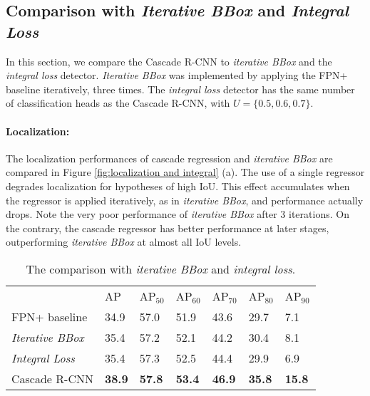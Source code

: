 \documentclass[10pt,twocolumn,letterpaper]{article}
\newcommand{\bd}[1]{\textbf{#1}}
\newcommand{\tablestyle}[2]{\setlength{\tabcolsep}{#1}\renewcommand{\arraystretch}{#2}\centering\footnotesize}
\begin{document}
\subsection{Comparison with \textit{Iterative BBox} and \textit{Integral Loss}}

In this section, we compare the Cascade R-CNN to \textit{iterative BBox} and the \textit{integral loss} detector. \textit{Iterative BBox} was implemented by applying the FPN+ baseline iteratively, three times. The \textit{integral loss} detector has the same number of classification heads as the Cascade R-CNN, with $U=\{0.5,0.6,0.7\}$.

\paragraph{Localization:} The localization performances of cascade regression
and \textit{iterative BBox} are compared in Figure \ref{fig:localization and integral} (a). The use of a single regressor degrades localization for hypotheses of high IoU. This effect accumulates when the regressor is applied iteratively, as in \textit{iterative BBox}, and performance actually drops. Note the very poor performance of \textit{iterative BBox} after 3 iterations. On the contrary, the cascade regressor has better performance at later stages, outperforming \textit{iterative BBox} at almost all IoU levels.

\begin{table}[t]
\tablestyle{1.8pt}{1.2}
\begin{tabular}{l|x{22}|x{22}x{22}x{22}x{22}x{22}}
& AP & AP$_{50}$ & AP$_{60}$ &AP$_{70}$ &AP$_{80}$ &AP$_{90}$\\ [.1em]
\shline
FPN+ baseline &34.9 &57.0  &51.9 &43.6 &29.7  &7.1\\
\textit{Iterative BBox} &35.4 &57.2  &52.1 &44.2 &30.4  &8.1\\
\textit{Integral Loss} &35.4 &57.3  &52.5 &44.4 &29.9  &6.9\\\hline
Cascade R-CNN &\bd{38.9} &\bd{57.8}  &\bd{53.4} &\bd{46.9} &\bd{35.8}  &\bd{15.8}\\
\end{tabular}\vspace{2mm}
\caption{The comparison with \textit{iterative BBox} and \textit{integral loss}.}
\label{tab:comparison}
\end{table}
\end{document}
